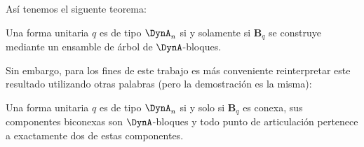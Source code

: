 Así tenemos el siguente teorema:\\

\begin{theorem}
Una forma unitaria $q$ es de tipo $\DynA_{n}$ si y solamente si $\textbf{B}_{q}$ se construye mediante un ensamble de árbol de $\DynA$-bloques.
\label{teorema:2.12}
\end{theorem}

Sin embargo, para los fines de este trabajo es más conveniente reinterpretar este resultado utilizando otras palabras (pero la demostración es la misma):

\begin{corollary}
Una forma unitaria $q$ es de tipo $\DynA_{n}$ si y solo si $\textbf{B}_{q}$ es conexa, sus componentes biconexas son $\DynA$-bloques y todo punto de articulación pertenece a exactamente dos de estas componentes.
\label{corolario:2.13}
\end{corollary}
